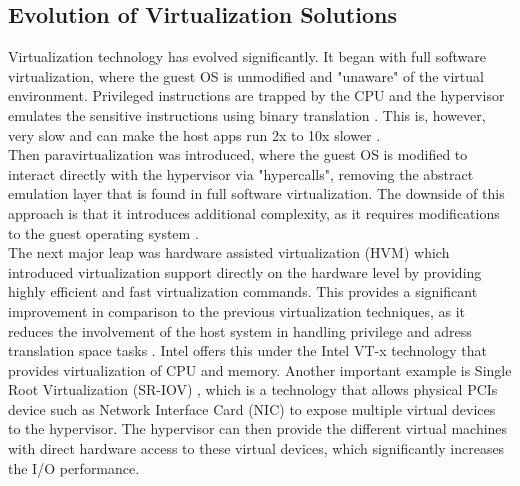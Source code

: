 \subsection{Evolution of Virtualization Solutions}
Virtualization technology has evolved significantly. It began with full software virtualization, 
where the guest OS is unmodified and "unaware" of the virtual environment. Privileged instructions 
are trapped by the CPU and the hypervisor emulates the sensitive instructions using 
binary translation \cite{virtualization_gregg}. This is, however, very slow and can make the host apps 
run 2x to 10x slower \cite{virtualization_gregg}. \\
Then paravirtualization was introduced, where the guest OS is modified to interact directly with the 
hypervisor via "hypercalls", removing the abstract emulation layer that is found in full 
software virtualization. The downside of this approach is that it introduces additional complexity, 
as it requires modifications to the guest operating system \cite{hvm}.\\ 
The next major leap was hardware assisted virtualization (HVM) which introduced virtualization support 
directly on the hardware level by providing highly efficient and fast virtualization commands. 
This provides a significant improvement in comparison to the previous virtualization 
techniques, as it reduces the involvement of the host system in handling privilege and adress translation
space tasks \cite{hvm}. Intel offers this under the Intel VT-x technology that provides virtualization of CPU and memory.
Another important example is Single Root Virtualization (SR-IOV) \cite{nitro_whitepaper}, which is a technology that allows physical 
PCIs device such as Network Interface Card (NIC) to expose multiple virtual devices to the hypervisor. 
The hypervisor can then provide the different virtual machines with direct hardware access to these virtual 
devices, which significantly increases the I/O performance. 


